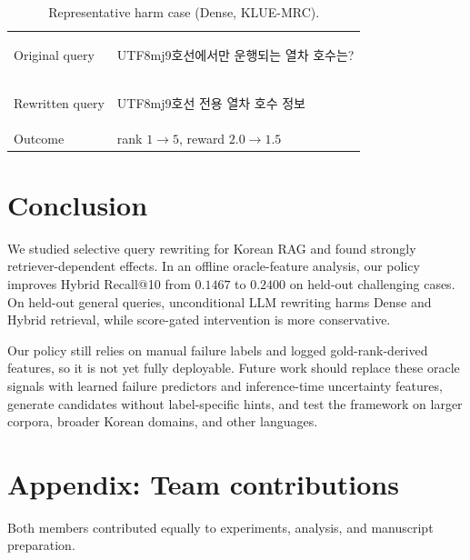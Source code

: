\documentclass{article}
\begin{document}
\begin{table}[h]
\centering
\caption{Representative harm case (Dense, KLUE-MRC).}
\label{tab:harm}
\small
\begin{tabular}{ll}
\toprule
Original query      & \begin{CJK}{UTF8}{mj}9호선에서만 운행되는 열차 호수는?\end{CJK} \\
Rewritten query     & \begin{CJK}{UTF8}{mj}9호선 전용 열차 호수 정보\end{CJK} \\
\midrule
Outcome             & rank $1 \to 5$,\; reward $2.0 \to 1.5$ \\
\bottomrule
\end{tabular}
\end{table}

\section{Conclusion}
We studied selective query rewriting for Korean RAG and found strongly
retriever-dependent effects. In an offline oracle-feature analysis, our policy
improves Hybrid Recall@10 from $0.1467$ to $0.2400$ on held-out challenging
cases. On held-out general queries, unconditional LLM rewriting harms Dense and
Hybrid retrieval, while score-gated intervention is more conservative.

Our policy still relies on manual failure labels and logged gold-rank-derived
features, so it is not yet fully deployable. Future work should replace these
oracle signals with learned failure predictors and inference-time uncertainty
features, generate candidates without label-specific hints, and test the
framework on larger corpora, broader Korean domains, and other languages.




\newpage
\appendix

\section{Appendix: Team contributions}
Both members contributed equally to experiments, analysis, and manuscript
preparation.
\end{document}
